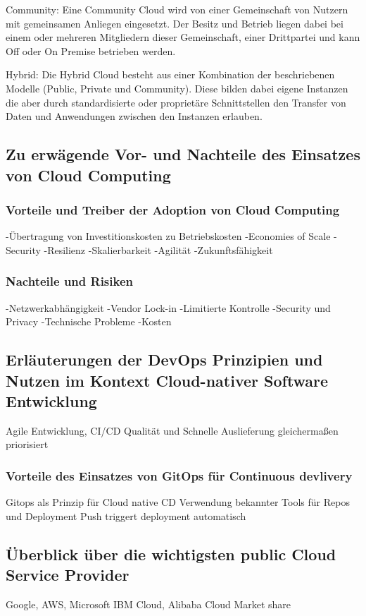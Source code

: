 Community: Eine Community Cloud wird von einer Gemeinschaft von Nutzern mit gemeinsamen
Anliegen eingesetzt. Der Besitz und Betrieb liegen dabei bei einem oder mehreren
Mitgliedern dieser Gemeinschaft, einer Drittpartei und kann Off oder On Premise betrieben
werden.

Hybrid: Die Hybrid Cloud besteht aus einer Kombination der beschriebenen Modelle
(Public, Private und Community). Diese bilden dabei eigene Instanzen die aber durch
standardisierte oder proprietäre Schnittstellen den Transfer von Daten und Anwendungen
zwischen den Instanzen erlauben.

\subsection{Zu erwägende Vor- und Nachteile des Einsatzes von Cloud Computing}

\subsubsection{Vorteile und Treiber der Adoption von Cloud Computing}



-Übertragung von Investitionskosten zu Betriebskosten
-Economies of Scale
-Security
-Resilienz
-Skalierbarkeit
-Agilität
-Zukunftsfähigkeit

\subsubsection{Nachteile und Risiken}

-Netzwerkabhängigkeit
-Vendor Lock-in
-Limitierte Kontrolle
-Security und Privacy
-Technische Probleme
-Kosten

\subsection{Erläuterungen der DevOps Prinzipien und Nutzen im Kontext Cloud-nativer Software Entwicklung}
Agile Entwicklung, CI/CD
Qualität und Schnelle Auslieferung gleichermaßen priorisiert

\subsubsection{Vorteile des Einsatzes von GitOps für Continuous devlivery}
Gitops als Prinzip für Cloud native CD
Verwendung bekannter Tools für Repos und Deployment
Push triggert deployment automatisch

\subsection{Überblick über die wichtigsten public Cloud Service Provider}
Google, AWS, Microsoft
IBM Cloud, Alibaba Cloud
Market share

